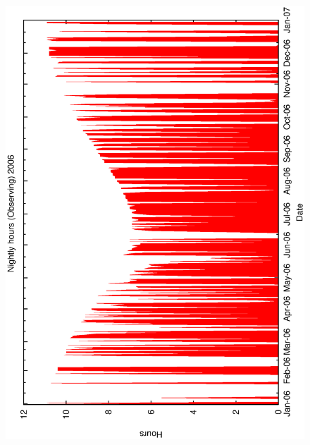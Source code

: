 {{\begin{figure}[htbp]
\begin{center}
{    \includegraphics[scale=0.4, angle=-90]{figures/ecs/met_nightly_stats_obs2006.eps}
  } 
\end{center}
\end{figure}}}

